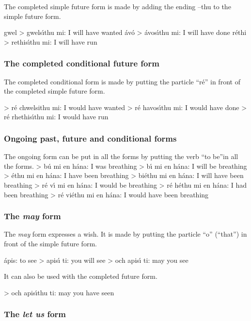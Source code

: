 The completed simple future form is made by adding the ending –thu to the simple future form.

gwel > gwels\'{\i}thu mi: I will have wanted
\'{a}v\'{o} > \'{a}vos\'{\i}thu mi: I will have done
r\'{e}thi > rethis\'{\i}thu mi: I will have run

\subsubsection{The completed conditional future form}

The completed conditional form is made by putting the particle “r\'{e}” in front of the completed simple future form.

> r\'{e} chwelsithu mi: I would have wanted
> r\'{e} havos\'{\i}thu mi: I would have done
> r\'{e} rhethis\'{\i}thu mi: I would have run

\subsubsection{Ongoing past, future and conditional forms}

The ongoing form can be put in all the forms by putting the verb “to be”in all the forms.
> b\'{u} mi en h\'{a}na: I was breathing
> b\'{\i} mi en h\'{a}na: I will be breathing
> \'{e}thu mi en h\'{a}na: I have been breathing
> bi\'{e}thu mi en h\'{a}na: I will have been breathing
> r\'{e} v\'{\i} mi en h\'{a}na: I would be breathing
> r\'{e} h\'{e}thu mi en h\'{a}na: I had been breathing
> r\'{e} vi\'{e}thu mi en h\'{a}na: I would have been breathing

\subsubsection{The \textit{may} form}

The \textit{may} form expresses a wish. It is made by putting the particle “o” (“that”) in front of the simple future form.

\'{a}pis: to see
> apis\'{\i} ti: you will see
> och apis\'{\i} ti: may you see

It can also be used with the completed future form.

> och apis\'{\i}thu ti: may you have seen

\subsubsection{The \textit{let us} form}

